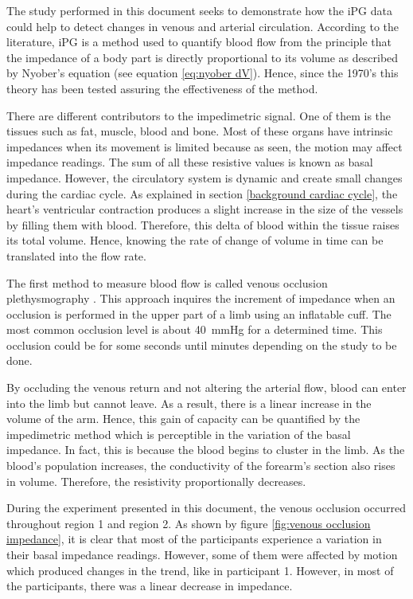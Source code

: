 The study performed in this document seeks to demonstrate how the iPG data could help to detect changes in venous and arterial circulation. According to the literature, iPG is a method used to quantify blood flow from the principle that the impedance of a body part is directly proportional to its volume as described by Nyober's equation  (see equation \ref{eq:nyober dV}).  Hence, since the 1970's this theory has been tested assuring the effectiveness of the method. 

There are different contributors to the impedimetric signal. One of them is the tissues such as fat, muscle, blood and bone. Most of these organs have intrinsic impedances when its movement is limited because as seen, the motion may affect impedance readings. The sum of all these resistive values is known as basal impedance.  However,  the circulatory system is dynamic and create small changes during the cardiac cycle.  As explained in section \ref{background cardiac cycle},  the heart's ventricular contraction produces a slight increase in the size of the vessels by filling them with blood. Therefore, this delta of blood within the tissue raises its total volume. Hence, knowing the rate of change of volume in time can be translated into the flow rate.

The first method to measure blood flow is called venous occlusion plethysmography \cite{wilkinson2001venous}. This approach inquires the increment of impedance when an occlusion is performed in the upper part of a limb using an inflatable cuff. The most common occlusion level is about \SI{40}{\mmHg} for a determined time. This occlusion could be for some seconds until minutes depending on the study to be done. 

By occluding the venous return and not altering the arterial flow, blood can enter into the limb but cannot leave.  As a result, there is a linear increase in the volume of the arm. Hence, this gain of capacity can be quantified by the impedimetric method which is perceptible in the variation of the basal impedance. In fact, this is because the blood begins to cluster in the limb. As the blood's population increases, the conductivity of the forearm's section also rises in volume. Therefore, the resistivity proportionally decreases. 

During the experiment presented in this document, the venous occlusion occurred throughout region 1 and region 2.  As shown by figure \ref{fig:venous occlusion impedance}, it is clear that most of the participants experience a variation in their basal impedance readings.  However, some of them were affected by motion which produced changes in the trend, like in participant 1. However, in most of the participants, there was a linear decrease in impedance. 


